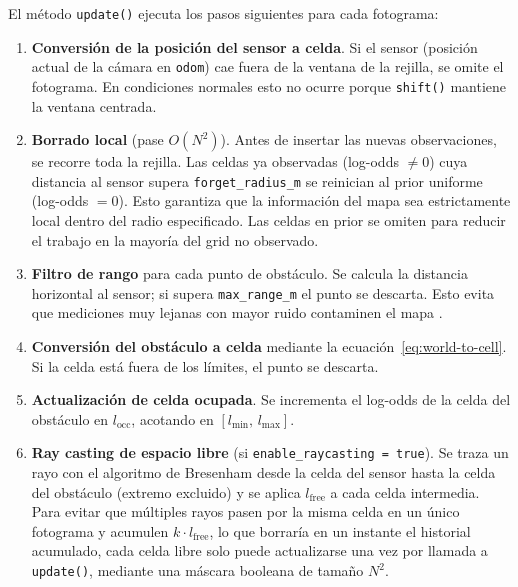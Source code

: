 El método \texttt{update()} ejecuta los pasos siguientes para cada fotograma:
%
\begin{enumerate}
  \item \textbf{Conversión de la posición del sensor a celda}. Si el sensor
    (posición actual de la cámara en \texttt{odom}) cae fuera de la ventana
    de la rejilla, se omite el fotograma. En condiciones normales esto no
    ocurre porque \texttt{shift()} mantiene la ventana centrada.

  \item \textbf{Borrado local} (pase $O(N^2)$).
    Antes de insertar las nuevas observaciones, se recorre toda la rejilla.
    Las celdas ya observadas (log-odds $\neq 0$) cuya distancia al sensor
    supera \texttt{forget\_radius\_m} se reinician al prior uniforme
    (log-odds $= 0$). Esto garantiza que la información del mapa sea
    estrictamente local dentro del radio especificado. Las celdas en prior
    se omiten para reducir el trabajo en la mayoría del grid no observado.

  \item \textbf{Filtro de rango} para cada punto de obstáculo. Se calcula la
    distancia horizontal al sensor; si supera \texttt{max\_range\_m} el punto
    se descarta. Esto evita que mediciones muy lejanas con mayor ruido
    contaminen el mapa \cite{IntelRealSenseDepthTuning}.

  \item \textbf{Conversión del obstáculo a celda} mediante la
    ecuación~\ref{eq:world-to-cell}. Si la celda está fuera de los límites,
    el punto se descarta.

  \item \textbf{Actualización de celda ocupada}. Se incrementa el log-odds de
    la celda del obstáculo en $l_{\text{occ}}$, acotando en $[l_{\min},\, l_{\max}]$.

  \item \textbf{Ray casting de espacio libre} (si \texttt{enable\_raycasting = true}).
    Se traza un rayo con el algoritmo de Bresenham desde la celda del sensor
    hasta la celda del obstáculo (extremo excluido) y se aplica
    $l_{\text{free}}$ a cada celda intermedia. Para evitar que múltiples
    rayos pasen por la misma celda en un único fotograma y acumulen
    $k \cdot l_{\text{free}}$, lo que borraría en un instante el historial
    acumulado, cada celda libre solo puede actualizarse una vez por llamada
    a \texttt{update()}, mediante una máscara booleana de tamaño $N^2$.
\end{enumerate}

